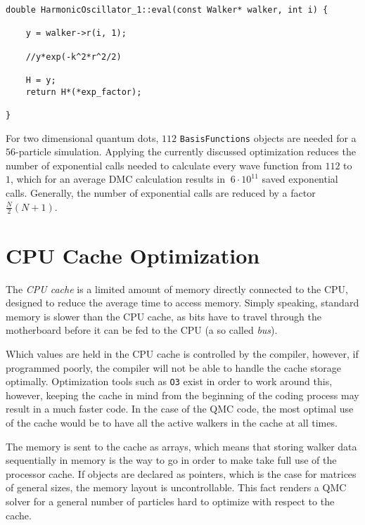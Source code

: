 \begin{lstlisting}[caption={The implementation of a single particle wave function. The pointer to the previously calculated exponential factor is simply accessed in line 8.}]
double HarmonicOscillator_1::eval(const Walker* walker, int i) {

    y = walker->r(i, 1);
    
    //y*exp(-k^2*r^2/2)
    
    H = y;
    return H*(*exp_factor);
    
}
\end{lstlisting}

For two dimensional quantum dots, $112$ \verb+BasisFunctions+ objects are needed for a $56$-particle simulation. Applying the currently discussed optimization reduces the number of exponential calls needed to calculate every wave function from $112$ to $1$, which for an average DMC calculation results in $~6\cdot 10^{11}$ saved exponential calls. Generally, the number of exponential calls are reduced by a factor $\frac{N}{2}(N + 1)$.


\section{CPU Cache Optimization}
\label{sec:CPUcache}

The \textit{CPU cache} is a limited amount of memory directly connected to the CPU, designed to reduce the average time to access memory. Simply speaking, standard memory is slower than the CPU cache, as bits have to travel through the motherboard before it can be fed to the CPU (a so called \textit{bus}). 

Which values are held in the CPU cache is controlled by the compiler, however, if programmed poorly, the compiler will not be able to handle the cache storage optimally. Optimization tools such as \verb+O3+ exist in order to work around this, however, keeping the cache in mind from the beginning of the coding process may result in a much faster code. In the case of the QMC code, the most optimal use of the cache would be to have all the active walkers in the cache at all times. 

The memory is sent to the cache as arrays, which means that storing walker data sequentially in memory is the way to go in order to make take full use of the processor cache. If objects are declared as pointers, which is the case for matrices of general sizes, the memory layout is uncontrollable. This fact renders a QMC solver for a general number of particles hard to optimize with respect to the cache.







